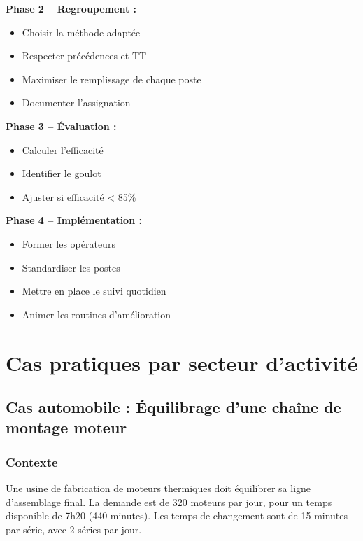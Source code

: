 \documentclass[12pt,a4paper]{article}
\begin{document}
\begin{center}
\textbf{Phase 2 – Regroupement :}
\begin{itemize}
    \item Choisir la méthode adaptée
    \item Respecter précédences et TT
    \item Maximiser le remplissage de chaque poste
    \item Documenter l’assignation
\end{itemize}

\textbf{Phase 3 – Évaluation :}
\begin{itemize}
    \item Calculer l’efficacité
    \item Identifier le goulot
    \item Ajuster si efficacité < 85\%
\end{itemize}

\textbf{Phase 4 – Implémentation :}
\begin{itemize}
    \item Former les opérateurs
    \item Standardiser les postes
    \item Mettre en place le suivi quotidien
    \item Animer les routines d’amélioration
\end{itemize}


\section{Cas pratiques par secteur d'activité}

\subsection{Cas automobile : Équilibrage d'une chaîne de montage moteur}

\subsubsection{Contexte}
Une usine de fabrication de moteurs thermiques doit équilibrer sa ligne d'assemblage final. La demande est de 320 moteurs par jour, pour un temps disponible de 7h20 (440 minutes). Les temps de changement sont de 15 minutes par série, avec 2 séries par jour.


\end{center}
\end{document}

